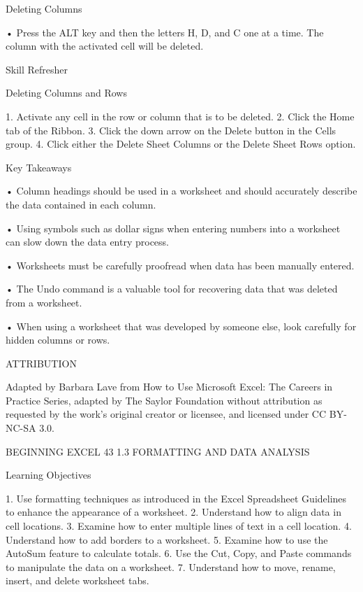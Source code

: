 Deleting Columns

• Press the ALT key and then the letters H, D, and C one at a time. The column with the activated cell will be
deleted.




Skill Refresher


Deleting Columns and Rows

1. Activate any cell in the row or column that is to be deleted.
2. Click the Home tab of the Ribbon.
3. Click the down arrow on the Delete button in the Cells group.
4. Click either the Delete Sheet Columns or the Delete Sheet Rows option.




Key Takeaways


• Column headings should be used in a worksheet and should accurately describe the data contained in each
column.

• Using symbols such as dollar signs when entering numbers into a worksheet can slow down the data entry
process.

• Worksheets must be carefully proofread when data has been manually entered.

• The Undo command is a valuable tool for recovering data that was deleted from a worksheet.

• When using a worksheet that was developed by someone else, look carefully for hidden columns or rows.



ATTRIBUTION

Adapted by Barbara Lave from How to Use Microsoft Excel: The Careers in Practice Series, adapted
by The Saylor Foundation without attribution as requested by the work’s original creator or
licensee, and licensed under CC BY-NC-SA 3.0.




BEGINNING EXCEL 43
1.3 FORMATTING AND DATA ANALYSIS




Learning Objectives


1. Use formatting techniques as introduced in the Excel Spreadsheet Guidelines to enhance the appearance
of a worksheet.
2. Understand how to align data in cell locations.
3. Examine how to enter multiple lines of text in a cell location.
4. Understand how to add borders to a worksheet.
5. Examine how to use the AutoSum feature to calculate totals.
6. Use the Cut, Copy, and Paste commands to manipulate the data on a worksheet.
7. Understand how to move, rename, insert, and delete worksheet tabs.



